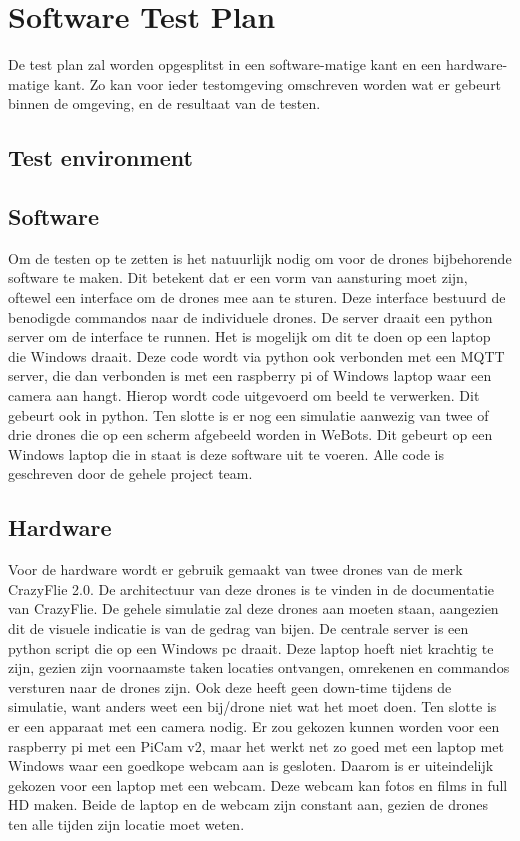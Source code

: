 \section{Software Test Plan}
De test plan zal worden opgesplitst in een software-matige kant en een hardware-matige kant. Zo kan voor ieder testomgeving 
omschreven worden wat er gebeurt binnen de omgeving, en de resultaat van de testen.

\subsection{Test environment}

\subsection*{Software}
Om de testen op te zetten is het natuurlijk nodig om voor de drones bijbehorende software te maken. Dit betekent dat er een vorm van aansturing moet zijn, oftewel een interface om de drones mee aan te sturen. Deze interface bestuurd de benodigde commandos naar de individuele drones. De server draait een python server om de interface te runnen. Het is mogelijk om dit te doen op een laptop die Windows draait.
Deze code wordt via python ook verbonden met een MQTT server, die dan verbonden is met een raspberry pi of Windows laptop waar een camera aan hangt. Hierop wordt code uitgevoerd om beeld te verwerken. Dit gebeurt ook in python.
Ten slotte is er nog een simulatie aanwezig van twee of drie drones die op een scherm afgebeeld worden in WeBots. Dit gebeurt op een Windows laptop die in staat is deze software uit te voeren.
Alle code is geschreven door de gehele project team.

\subsection*{Hardware}
Voor de hardware wordt er gebruik gemaakt van twee drones van de merk CrazyFlie 2.0. De architectuur van deze drones is te vinden in de documentatie van CrazyFlie. De gehele simulatie zal deze drones aan moeten staan, aangezien dit de visuele indicatie is van de gedrag van bijen.
De centrale server is een python script die op een Windows pc draait. Deze laptop hoeft niet krachtig te zijn, gezien zijn voornaamste taken locaties ontvangen, omrekenen en commandos versturen naar de drones zijn. Ook deze heeft geen down-time tijdens de simulatie, want anders weet een bij/drone niet wat het moet doen.
Ten slotte is er een apparaat met een camera nodig. Er zou gekozen kunnen worden voor een raspberry pi met een PiCam v2, maar het werkt net zo goed met een laptop met Windows waar een goedkope webcam aan is gesloten. Daarom is er uiteindelijk gekozen voor een laptop met een webcam. Deze webcam kan fotos en films in full HD maken. Beide de laptop en de webcam zijn constant aan, gezien de drones ten alle tijden zijn locatie moet weten.

